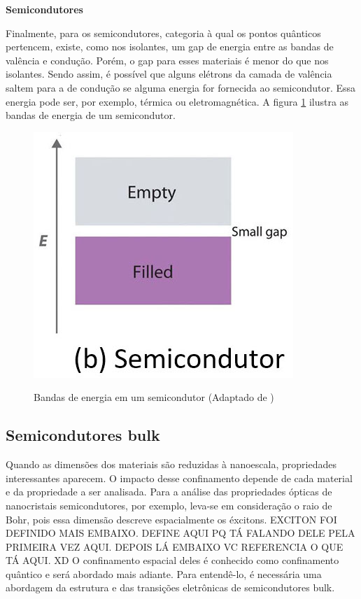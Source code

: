 	\par \textbf{Semicondutores}
	
	\par Finalmente, para os semicondutores, categoria à qual os pontos quânticos pertencem, existe, como nos isolantes, um gap de energia entre as bandas de valência e condução. Porém, o gap para esses materiais é menor do que nos isolantes. Sendo assim, é possível que alguns elétrons da camada de valência saltem para a de condução se alguma energia for fornecida ao semicondutor. Essa energia pode ser, por exemplo, térmica ou eletromagnética. A figura \ref{fig5} ilustra as bandas de energia de um semicondutor.

	\begin{figure}[h!]
      \caption{Bandas de energia em um semicondutor (Adaptado de \cite{bulk1})}
      \centering
      \includegraphics{images/figura5.jpg}
      \label{fig5}
    \end{figure}

\subsection{Semicondutores bulk}

	\par Quando as dimensões dos materiais são reduzidas à nanoescala, propriedades interessantes aparecem. O impacto desse confinamento depende de cada material e da propriedade a ser analisada. Para a análise das propriedades ópticas de nanocristais semicondutores, por exemplo, leva-se em consideração o raio de Bohr, pois essa dimensão descreve espacialmente os éxcitons. EXCITON FOI DEFINIDO MAIS EMBAIXO. DEFINE AQUI PQ TÁ FALANDO DELE PELA PRIMEIRA VEZ AQUI. DEPOIS LÁ EMBAIXO VC REFERENCIA O QUE TÁ AQUI. XD O confinamento espacial deles é conhecido como confinamento quântico e será abordado mais adiante. Para entendê-lo, é necessária uma abordagem da estrutura e das transições eletrônicas de semicondutores bulk. 

